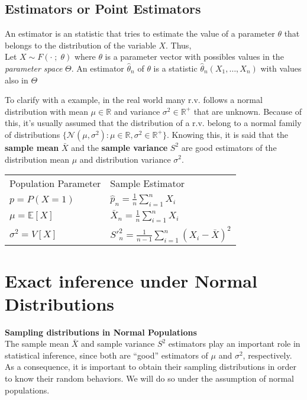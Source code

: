 \subsection{Estimators or Point Estimators}
An estimator is an statistic that tries to estimate the value of a parameter
$\theta$ that belongs to the distribution of the variable $X$. Thus,\\

Let $X \sim F(\cdot\;;\;\theta)$ where $\theta$ is a parameter vector with
possibles values in the \textit{parameter space} $\Theta$. An estimator
$\hat{\theta}_n$ of $\theta$ is a statistic $\hat{\theta}_n(X_1,\dots,X_n)$ with
values also in $\Theta$ 

To clarify with a example, in the real world many r.v. follows a normal
distribution with mean $\mu \in \mathbb{R}$ and variance $\sigma^2 \in
\mathbb{R}^+$ that are unknown. Because of this, it's usually assumed that the
distribution of a r.v. belong to a normal family of distributions
$\{\mathcal{N}(\mu,\sigma^2):\mu\in\mathbb{R},\sigma^2\in \mathbb{R^+} \}$.
Knowing this, it is said that the \textbf{sample mean} $\bar{X}$ and the
\textbf{sample variance} $S^2$ are good estimators of the distribution mean
$\mu$ and distribution variance $\sigma^2$.

\begin{table}[H]
    \centering
    \begin{tabular}{ll}
    Population Parameter    & Sample Estimator                          \\
    $p = P(X=1)$            & $\hat{p}_n = \frac{1}{n}\sum_{i=1}^n X_i$ \\
    $\mu = \mathbb{E}[X]$   & $\bar{X}_n = \frac{1}{n}\sum_{i=1}^n X_i$ \\
    $\sigma^2 = V[X]$       & $S'^2_n = \frac{1}{n-1}\sum_{i=1}^{n}
    (X_i-\bar{X})^2 $
    \end{tabular}
\end{table}

\section{Exact inference under Normal Distributions}
\textbf{Sampling distributions in Normal Populations}\\
The sample mean $\bar{X}$ and sample variance $S^2$ estimators play an important
role in statistical inference, since both are “good” estimators of $\mu$ and
$\sigma^2$, respectively. As a consequence, it is important to obtain their
sampling distributions in order to know their random behaviors. We will do so
under the assumption of normal populations.

